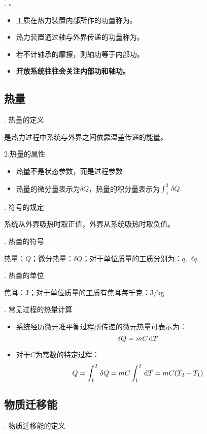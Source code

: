 . 、
\begin{itemize}
	\item 工质在热力装置内部所作的功量称为。
	\item 热力装置通过轴与外界传递的功量称为。
	\item 若不计轴承的摩擦，则轴功等于内部功。
	\item \textbf{开放系统往往会关注内部功和轴功。}
\end{itemize}
\vspace*{1.5em}

\subsection{热量}
. 热量的定义

是热力过程中系统与外界之间依靠温差传递的能量。\rgap

\noindent 2.热量的属性
\begin{itemize}
	\item 热量不是状态参数，而是过程参数
	\item 热量的微分量表示为$\delta Q$，热量的积分量表示为$\displaystyle \int_{1}^{2} \,\delta Q.$
\end{itemize}

. 符号的规定
\par 系统从外界吸热时取正值，外界从系统吸热时取负值。\rgap

. 热量的符号
\par 热量：$Q$；微分热量：$\delta Q$；对于单位质量的工质分别为：$q, \,\,\delta q.$\rgap

. 热量的单位
\par 焦耳：J；对于单位质量的工质有焦耳每千克：J/kg.\rgap

. 常见过程的热量计算
\begin{itemize}
	\item 系统经历微元准平衡过程所传递的微元热量可表示为：
	\begin{equation}
		\delta Q = mC \,{\rm{d}} T
	\end{equation}
	\item 对于$C$为常数的特定过程：
	\begin{equation}
		Q = \int_{1}^{2} \,\delta Q =mC \int_{1}^{2} \,{\rm{d}} T =mC(T_2 -T_1)
	\end{equation}
\end{itemize}

\subsection{物质迁移能}
. 物质迁移能的定义

